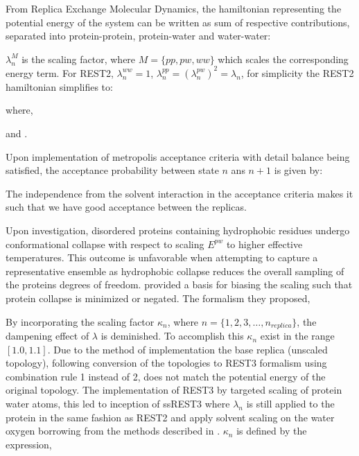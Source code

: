From Replica Exchange Molecular Dynamics\cite{Sugita1999}, the hamiltonian representing the potential energy of the system can be written as sum of respective contributions, separated into protein-protein, protein-water and water-water:


$\lambda_{n}^M$ is the scaling factor, where $M=\{ pp, pw, ww\}
$ which scales the corresponding energy term. For REST2\cite{Wang2011}, $\lambda_n^{ww}=1$, $\lambda_n^{pp}=(\lambda_n^{pw})^2=\lambda_n$, for simplicity the REST2 hamiltonian simplifies to:

where,

and . 

Upon implementation of metropolis acceptance criteria with detail balance being satisfied, the acceptance probability between state $n$ ans $n+1$ is given by:


The independence from the solvent interaction in the acceptance criteria makes it such that we have good acceptance between the replicas.  

Upon investigation, disordered proteins containing hydrophobic residues undergo conformational collapse with respect to scaling  $E^{pw}$ to higher effective temperatures. 
This outcome is unfavorable when attempting to capture a representative ensemble as hydrophobic collapse reduces the overall sampling of the proteins degrees of freedom. %
\citeauthor{Zhang2023} \citeyear{Zhang2023} provided a basis for biasing the scaling such that protein collapse is minimized or negated. The formalism they proposed,


By incorporating the scaling factor $\kappa_n$, where $n=\{1,2,3,\ldots,n_{replica}\}$, the dampening effect of $\lambda$ is deminished. To accomplish this $\kappa_n$ exist in the range $[1.0,1.1]$. Due to the method of implementation the base replica (unscaled topology), following conversion of the topologies to REST3 \cite{Zhang2023} formalism using combination rule 1 instead of 2, does not match the potential energy of the original topology. 
The implementation of REST3 by \citeauthor{Zhang2023} targeted scaling of protein water atoms, this led to inception of ssREST3 where $\lambda_n$ is still applied to the protein in the same fashion as REST2 \cite{Wang2011} and apply solvent scaling on the water oxygen borrowing from the methods described in \citeauthor{Best2010} \citeyear{Best2010}. $\kappa_n$ is defined by the expression, 



